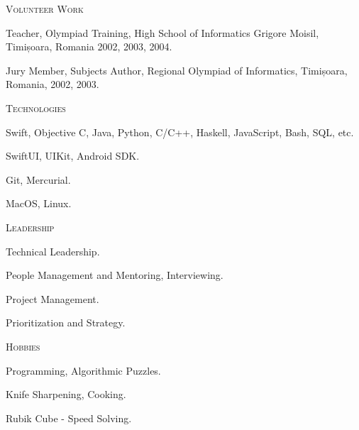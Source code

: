 \documentclass[11pt]{article}
\begin{document}
\vspace{0.12in}

\noindent
\textcolor{Primary}{{\large \textsc{Volunteer Work}}}
\begin{list}{}{\leftmargin=0em}
  \setlength{\itemsep}{1pt}
  \setlength{\parskip}{0pt}
  \setlength{\parsep}{0pt}
  \item{Teacher, Olympiad Training, High School of Informatics Grigore Moisil, Timișoara, Romania 2002, 2003, 2004.}
  \item{Jury Member, Subjects Author, Regional Olympiad of Informatics, Timișoara, Romania, 2002, 2003.}
\end{list}

\vspace{0.12in}

\noindent
\textcolor{Primary}{{\large \textsc{Technologies}}}
\begin{list}{}{\leftmargin=0em}
  \setlength{\itemsep}{1pt}
  \setlength{\parskip}{0pt}
  \setlength{\parsep}{0pt}
  \item{Swift, Objective C, Java, Python, C/C++, Haskell, JavaScript, Bash, SQL, etc.}
  \item{SwiftUI, UIKit, Android SDK.}
  \item{Git, Mercurial.}
  \item{MacOS, Linux.}
\end{list}

\vspace{0.12in}

\noindent
\textcolor{Primary}{{\large \textsc{Leadership}}}
\begin{list}{}{\leftmargin=0em}
  \setlength{\itemsep}{1pt}
  \setlength{\parskip}{0pt}
  \setlength{\parsep}{0pt}
  \item{Technical Leadership.}
  \item{People Management and Mentoring, Interviewing.}
  \item{Project Management.}
  \item{Prioritization and Strategy.}
\end{list}

\vspace{0.12in}

\noindent
\textcolor{Primary}{{\large \textsc{Hobbies}}}
\begin{list}{}{\leftmargin=0em}
  \setlength{\itemsep}{1pt}
  \setlength{\parskip}{0pt}
  \setlength{\parsep}{0pt}
  \item{Programming, Algorithmic Puzzles.}
  \item{Knife Sharpening, Cooking.}
  \item{Rubik Cube - Speed Solving.}
\end{list}
\end{document}
